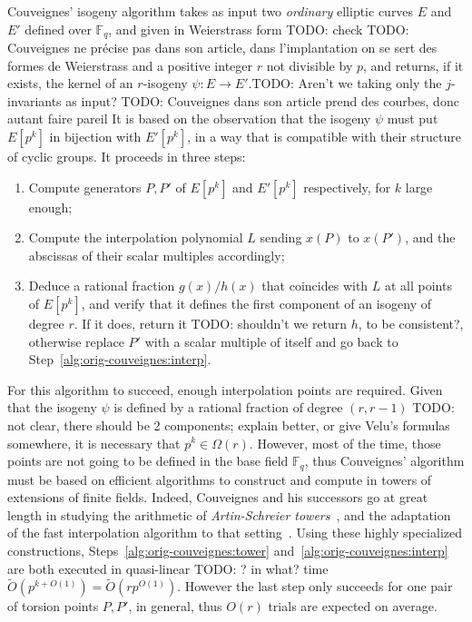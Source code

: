 \documentclass{lms}
\newcommand{\todo}[1]{{\color{red}TODO: #1}}
\newcommand{\F}{\mathbb{F}}
\newcommand{\tildO}{\tilde{O}}
\begin{document}
Couveignes' isogeny algorithm takes as input two \emph{ordinary}
elliptic curves $E$ and $E'$ defined over $\F_q$, and given in Weierstrass form
\todo{check} \todo{Couveignes ne précise pas dans son article, dans l'implantation on se sert des formes de Weierstrass} and a positive integer $r$ not
divisible by $p$, and returns, if it exists, the kernel of an
$r$-isogeny $ψ:E\to E'$.\todo{Aren't we taking only the $j$-invariants as input?} \todo{ Couveignes dans son article prend des courbes, donc autant faire pareil} It is based on the observation that the
isogeny $ψ$ must put $E[p^k]$ in bijection with $E'[p^k]$, in a way
that is compatible with their structure of cyclic groups. 
It proceeds in three steps:
\begin{enumerate}
\item\label{alg:orig-couveignes:tower} Compute generators $P,P'$ of
  $E[p^k]$ and $E'[p^k]$ respectively, for $k$ large enough;
\item\label{alg:orig-couveignes:interp} Compute the interpolation
  polynomial $L$ sending $x(P)$ to $x(P')$, and the abscissas of
  their scalar multiples accordingly;
\item\label{alg:orig-couveignes:rational} Deduce a rational fraction $g(x)/h(x)$
  that coincides with $L$ at all points of $E[p^k]$, and verify that
  it defines the first component of an isogeny of degree $r$. If it
  does, return it \todo{shouldn't we return $h$, to be consistent?}, 
otherwise replace $P'$ with a scalar multiple of
  itself and go back to Step~\ref{alg:orig-couveignes:interp}.
\end{enumerate}

For this algorithm to succeed, enough interpolation points are
required. Given that the isogeny $ψ$ is defined by a rational fraction
of degree $(r,r-1)$ \todo{not clear, there should be 2 components; explain better, or give Velu's 
formulas somewhere}, it is necessary that $p^k∈\Omega(r)$. However, most of
the time, those points are not going to be defined in the base field
$\F_q$, thus Couveignes' algorithm must be based on efficient
algorithms to construct and compute in towers of extensions of finite
fields. Indeed, Couveignes and his successors go at great length in
studying the arithmetic of \emph{Artin-Schreier
  towers}~\cite{couveignes00,df+schost12}, and the adaptation of the
fast interpolation algorithm to that setting~\cite{df10}.  Using these
highly specialized constructions,
Steps~\ref{alg:orig-couveignes:tower}
and~\ref{alg:orig-couveignes:interp} are both executed in quasi-linear
\todo{? in what?}
time $\tildO(p^{k+O(1)})=\tildO(rp^{O(1)})$. However the last step
only succeeds for one pair of torsion points $P,P'$, in general, thus
$O(r)$ trials are expected on average.
\end{document}
